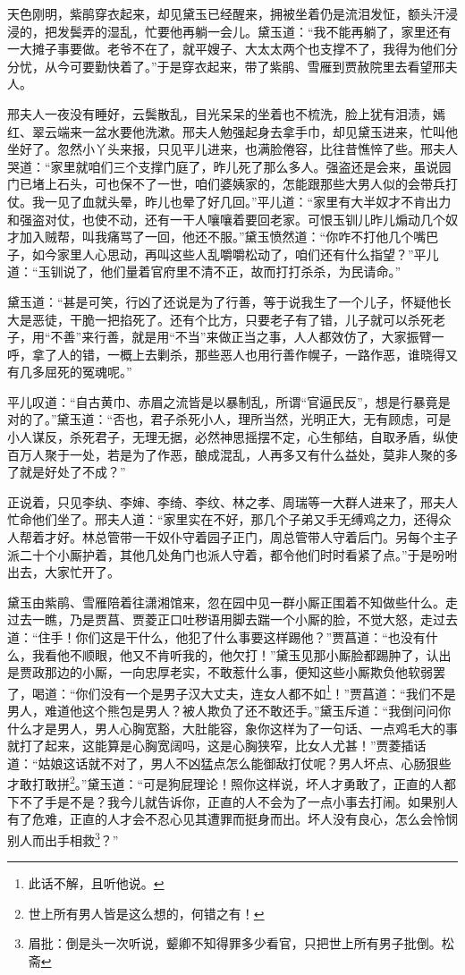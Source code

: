 \documentclass[12pt,oneside]{book}
\begin{document}
天色刚明，紫鹃穿衣起来，却见黛玉已经醒来，拥被坐着仍是流泪发怔，额头汗浸浸的，把发鬓弄的湿乱，忙要他再躺一会儿。黛玉道：“我不能再躺了，家里还有一大摊子事要做。老爷不在了，就平嫂子、大太太两个也支撑不了，我得为他们分分忧，从今可要勤快着了。”于是穿衣起来，带了紫鹃、雪雁到贾赦院里去看望邢夫人。

邢夫人一夜没有睡好，云鬓散乱，目光呆呆的坐着也不梳洗，脸上犹有泪渍，嫣红、翠云端来一盆水要他洗漱。邢夫人勉强起身去拿手巾，却见黛玉进来，忙叫他坐好了。忽然小丫头来报，只见平儿进来，也满脸倦容，比往昔憔悴了些。邢夫人哭道：“家里就咱们三个支撑门庭了，昨儿死了那么多人。强盗还是会来，虽说园门已堵上石头，可也保不了一世，咱们婆姨家的，怎能跟那些大男人似的会带兵打仗。我一见了血就头晕，昨儿也晕了好几回。”平儿道：“家里有大半奴才不肯出力和强盗对仗，也使不动，还有一干人嚷嚷着要回老家。可恨玉钏儿昨儿煽动几个奴才加入贼帮，叫我痛骂了一回，他还不服。”黛玉愤然道：“你咋不打他几个嘴巴子，如今家里人心思动，再叫这些人乱嚼嚼松动了，咱们还有什么指望？”平儿道：“玉钏说了，他们量着官府里不清不正，故而打打杀杀，为民请命。”

黛玉道：“甚是可笑，行凶了还说是为了行善，等于说我生了一个儿子，怀疑他长大是恶徒，干脆一把掐死了。还有个比方，只要老子有了错，儿子就可以杀死老子，用“不善”来行善，就是用“不当”来做正当之事，人人都效仿了，大家振臂一呼，拿了人的错，一概上去剿杀，那些恶人也用行善作幌子，一路作恶，谁晓得又有几多屈死的冤魂呢。”

平儿叹道：“自古黄巾、赤眉之流皆是以暴制乱，所谓“官逼民反”，想是行暴竟是对的了。”黛玉道：“否也，君子杀死小人，理所当然，光明正大，无有顾虑，可是小人谋反，杀死君子，无理无据，必然神思摇摆不定，心生郁结，自取矛盾，纵使百万人聚于一处，若是为了作恶，酿成混乱，人再多又有什么益处，莫非人聚的多了就是好处了不成？”

正说着，只见李纨、李婶、李绮、李纹、林之孝、周瑞等一大群人进来了，邢夫人忙命他们坐了。邢夫人道：“家里实在不好，那几个子弟又手无缚鸡之力，还得众人帮着才好。林总管带一干奴仆守着园子正门，周总管带人守着后门。另每个主子派二十个小厮护着，其他几处角门也派人守着，都令他们时时看紧了点。”于是吩咐出去，大家忙开了。

黛玉由紫鹃、雪雁陪着往潇湘馆来，忽在园中见一群小厮正围着不知做些什么。走过去一瞧，乃是贾菖、贾菱正口吐秽语用脚去踹一个小厮的脸，不觉大怒，走过去道：“住手！你们这是干什么，他犯了什么事要这样踢他？”贾菖道：“也没有什么，我看他不顺眼，他又不肯听我的，他欠打！”黛玉见那小厮脸都踢肿了，认出是贾政那边的小厮，一向忠厚老实，不敢惹什么事，便知这些小厮欺负他软弱罢了，喝道：“你们没有一个是男子汉大丈夫，连女人都不如\footnote{此话不解，且听他说。}！”贾菖道：“我们不是男人，难道他这个熊包是男人？被人欺负了还不敢还手。”黛玉斥道：“我倒问问你什么才是男人，男人心胸宽豁，大肚能容，象你这样为了一句话、一点鸡毛大的事就打了起来，这能算是心胸宽阔吗，这是心胸狭窄，比女人尤甚！”贾菱插话道：“姑娘这话就不对了，男人不凶猛点怎么能御敌打仗呢？男人坏点、心肠狠些才敢打敢拼\footnote{世上所有男人皆是这么想的，何错之有！}。”黛玉道：“可是狗屁理论！照你这样说，坏人才勇敢了，正直的人都下不了手是不是？我今儿就告诉你，正直的人不会为了一点小事去打闹。如果别人有了危难，正直的人才会不忍心见其遭罪而挺身而出。坏人没有良心，怎么会怜悯别人而出手相救\footnote{眉批：倒是头一次听说，颦卿不知得罪多少看官，只把世上所有男子批倒。松斋}？”
\end{document}
